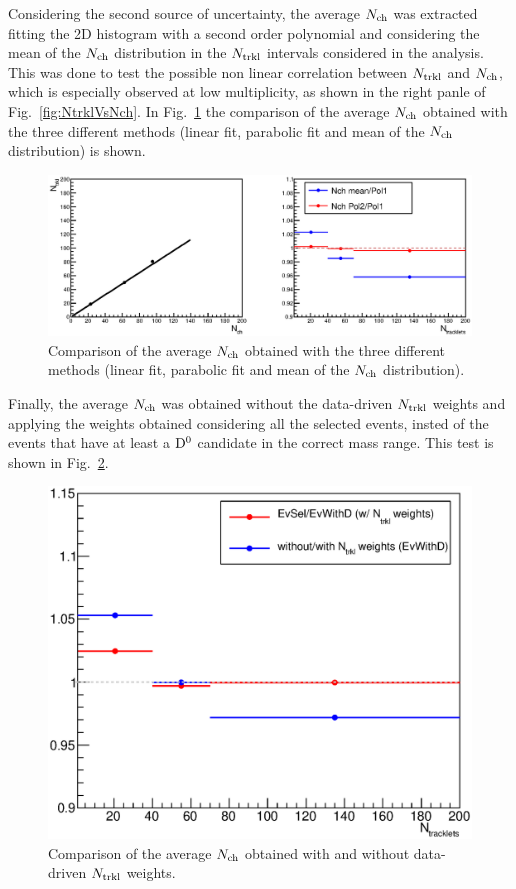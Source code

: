 Considering the second source of uncertainty, the average $N_{\rm ch}$ was extracted fitting the 2D histogram with a second order polynomial and considering the mean of the $N_{\rm ch}$ distribution in the $N_{\rm trkl}$ intervals considered in the analysis. This was done to test the possible non linear correlation between $N_{\rm trkl}$ and $N_{\rm ch}$, which is especially observed at low multiplicity, as shown in the right panle of Fig.~\ref{fig:NtrklVsNch}. In Fig.~\ref{fig:NchVsCorrHypo} the comparison of the average $N_{\rm ch}$ obtained with the three different methods (linear fit, parabolic fit and mean of the $N_{\rm ch}$ distribution) is shown.

\begin{figure}[htpb]
\centering
 \includegraphics[width=.9\textwidth]{FigCap6/NchSystematics_linFit_17f2a}
 \caption{Comparison of the average $N_{\rm ch}$ obtained with the three different methods (linear fit, parabolic fit and mean of the $N_{\rm ch}$ distribution).}
 \label{fig:NchVsCorrHypo}
 \end{figure}

Finally, the average $N_{\rm ch}$ was obtained without the data-driven $N_{\rm trkl}$ weights and applying the weights obtained considering all the selected events, insted of the events that have at least a ${\rm D^0}$ candidate in the correct mass range. This test is shown in Fig.~\ref{fig:NchVsNtrklWithWOweights}.

\begin{figure}[htpb]
\centering
 \includegraphics[width=.7\textwidth]{FigCap6/NchSystematics_NtrklWeights_17f2a.eps}
 \caption{Comparison of the average $N_{\rm ch}$ obtained with and without data-driven $N_{\rm trkl}$ weights.}
 \label{fig:NchVsNtrklWithWOweights}
 \end{figure}

